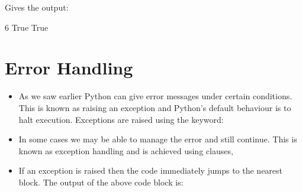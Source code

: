 \documentclass[letterpaper,10pt,english,openany]{sphinxmanual}
\begin{document}
Gives the output:

\begin{sphinxVerbatim}[commandchars=\\\{\}]
6
True
True
\end{sphinxVerbatim}


\section{Error Handling}
\label{\detokenize{introduction_to_python/error_handling:error-handling}}\label{\detokenize{introduction_to_python/error_handling:id1}}\label{\detokenize{introduction_to_python/error_handling::doc}}\begin{itemize}
\item {} 
As we saw earlier Python can give error messages under certain
conditions. This is known as raising an exception and Python’s
default behaviour is to halt execution. Exceptions are raised using
the  keyword:

\end{itemize}

\begin{sphinxVerbatim}[commandchars=\\\{\}]

 
\end{sphinxVerbatim}
\begin{itemize}
\item {} 
In some cases we may be able to manage the error and still continue.
This is known as exception handling and is achieved using
 clauses,

\end{itemize}

\begin{sphinxVerbatim}[commandchars=\\\{\}]
  \PYG{p}{[}\PYG{p}{]}

   
          \PYG{p}{[}\PYG{p}{]}
     
\end{sphinxVerbatim}
\begin{itemize}
\item {} 
If an exception is raised then the code immediately jumps to the
nearest  block. The output of the above code block is:

\end{itemize}
\end{document}
